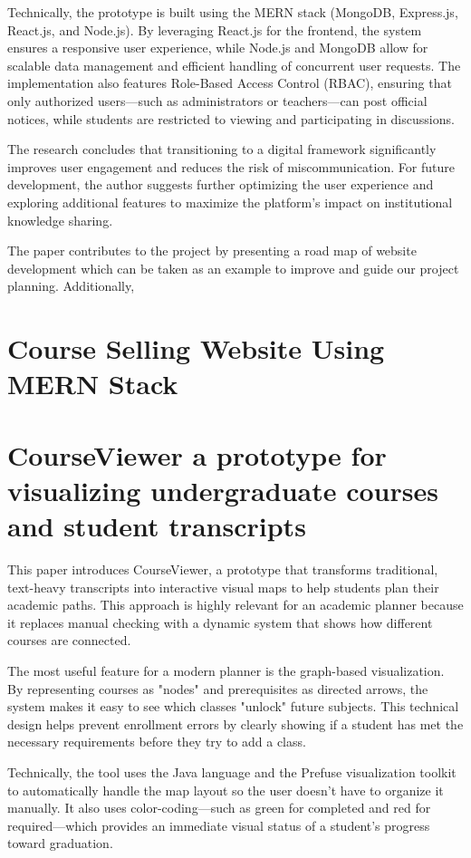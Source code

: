 Technically, the prototype is built using the MERN stack (MongoDB, Express.js, React.js, and Node.js). By leveraging React.js for the frontend, the system ensures a responsive user experience, while Node.js and MongoDB allow for scalable data management and efficient handling of concurrent user requests. The implementation also features Role-Based Access Control (RBAC), ensuring that only authorized users—such as administrators or teachers—can post official notices, while students are restricted to viewing and participating in discussions.

The research concludes that transitioning to a digital framework significantly improves user engagement and reduces the risk of miscommunication. For future development, the author suggests further optimizing the user experience and exploring additional features to maximize the platform's impact on institutional knowledge sharing.

The paper contributes to the project by presenting a road map of website development which can be taken as an example to improve and guide our project planning. Additionally, 

\section{Course Selling Website Using MERN Stack \cite{paper_12}}

\section{CourseViewer a prototype for visualizing undergraduate courses and student transcripts \cite {paper_15}}

This paper introduces CourseViewer, a prototype that transforms traditional, text-heavy transcripts into interactive visual maps to help students plan their academic paths. This approach is highly relevant for an academic planner because it replaces manual checking with a dynamic system that shows how different courses are connected.

The most useful feature for a modern planner is the graph-based visualization. By representing courses as "nodes" and prerequisites as directed arrows, the system makes it easy to see which classes "unlock" future subjects. This technical design helps prevent enrollment errors by clearly showing if a student has met the necessary requirements before they try to add a class.

Technically, the tool uses the Java language and the Prefuse visualization toolkit to automatically handle the map layout so the user doesn't have to organize it manually. It also uses color-coding—such as green for completed and red for required—which provides an immediate visual status of a student's progress toward graduation.


